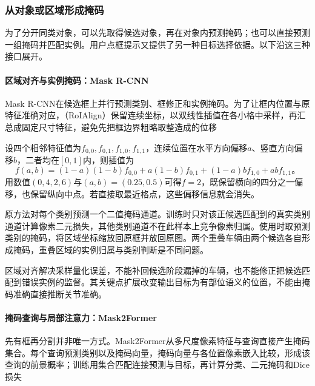 \subsubsection{从对象或区域形成掩码}
\label{sec:vision-recognition-mask-sets}

为了分开同类对象，可以先取得候选对象，再在对象内预测掩码；也可以直接预测一组掩码并匹配实例。用户点框提示又提供了另一种目标选择依据。以下沿这三种接口展开。

\paragraph{区域对齐与实例掩码：Mask R-CNN}
\label{sec:vision-recognition-mask-rcnn}

Mask R-CNN在候选框上并行预测类别、框修正和实例掩码。为了让框内位置与原特征准确对应，（RoIAlign）保留连续坐标，以双线性插值在各小格中采样，再汇总成固定尺寸特征，避免先把框边界粗略取整造成的位移

设四个相邻特征值为$f_{0,0},f_{0,1},f_{1,0},f_{1,1}$，连续位置在水平方向偏移$a$、竖直方向偏移$b$，二者均在$[0,1]$内，则插值为
\begin{equation}
 f(a,b)=(1-a)(1-b)f_{0,0}
 +a(1-b)f_{0,1}+(1-a)bf_{1,0}+abf_{1,1}\text{。}
 \label{eq:vision-roialign}
\end{equation}
用数值$(0,4,2,6)$与$(a,b)=(0.25,0.5)$可得$f=2$，既保留横向的四分之一偏移，也保留纵向中点。若直接取最近格点，这些偏移信息就会消失。

原方法对每个类别预测一个二值掩码通道。训练时只对该正候选匹配到的真实类别通道计算像素二元损失，其他类别通道不在此样本上竞争像素归属。使用时取预测类别的掩码，将区域坐标缩放回原框并放回原图。两个重叠车辆由两个候选各自形成掩码，重叠区域的实例归属与类别判断是不同问题。

区域对齐解决采样量化误差，不能补回候选阶段漏掉的车辆，也不能修正把候选匹配到错误实例的监督。其关键点扩展改变输出目标为有部位语义的位置，不能由掩码准确直接推断关节准确。

\paragraph{掩码查询与局部注意力：Mask2Former}
\label{sec:vision-recognition-mask2former}

先有框再分割并非唯一方式。Mask2Former从多尺度像素特征与查询直接产生掩码集合。每个查询预测类别以及掩码向量，掩码向量与各位置像素嵌入比较，形成该查询的前景概率；训练用集合匹配连接预测与目标，再计算分类、二元掩码和Dice损失

